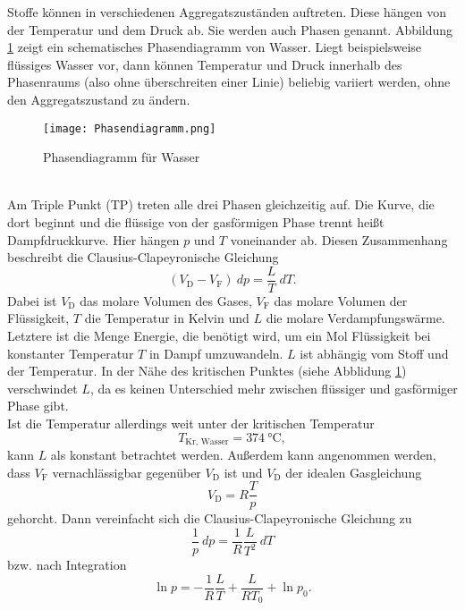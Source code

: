 Stoffe können in verschiedenen Aggregatszuständen auftreten. Diese hängen von der Temperatur und dem Druck ab. Sie werden auch Phasen genannt. Abbildung \ref{Phasendiagramm} zeigt ein schematisches Phasendiagramm von Wasser. Liegt beispielsweise flüssiges Wasser vor, dann können Temperatur und Druck innerhalb des Phasenraums (also ohne überschreiten einer Linie) beliebig variiert werden, ohne den Aggregatszustand zu ändern.
\begin{figure}[ht!]
	\centering
	\texttt{[image: Phasendiagramm.png]}
	\caption{Phasendiagramm für Wasser\cite{V203}}
	\label{Phasendiagramm}
\end{figure} \\
Am Triple Punkt (TP) treten alle drei Phasen gleichzeitig auf. Die Kurve, die dort beginnt und die flüssige von der gasförmigen Phase trennt heißt Dampfdruckkurve. Hier hängen $p$ und $T$ voneinander ab. Diesen Zusammenhang beschreibt die Clausius-Clapeyronische Gleichung
\begin{equation}\label{Clausius}
	(V_\text{D}-V_\text{F})\ dp = \frac{L}{T}\ dT.
\end{equation}
Dabei ist $V_\text{D}$ das molare Volumen des Gases, $V_\text{F}$ das molare Volumen der Flüssigkeit, $T$ die Temperatur in Kelvin und $L$ die molare Verdampfungswärme. \\
Letztere ist die Menge Energie, die benötigt wird, um ein Mol Flüssigkeit bei konstanter Temperatur $T$ in Dampf umzuwandeln. $L$ ist abhängig vom Stoff und der Temperatur. In der Nähe des kritischen Punktes (siehe Abblidung \ref{Phasendiagramm}) verschwindet $L$, da es keinen Unterschied mehr zwischen flüssiger und gasförmiger Phase gibt. \\
Ist die Temperatur allerdings weit unter der kritischen Temperatur \[T_\text{Kr, Wasser} = \SI{374}{\celsius},\] kann $L$ als konstant betrachtet werden. Außerdem kann angenommen werden, dass $V_\text{F}$ vernachlässigbar gegenüber $V_\text{D}$ ist und $V_\text{D}$ der idealen Gasgleichung
\begin{equation}\label{ideales Gas}
	V_\text{D} = R\frac{T}{p}
\end{equation}
gehorcht. Dann vereinfacht sich die Clausius-Clapeyronische Gleichung zu
\begin{equation}\label{Clausius einfach}
	\frac{1}{p}\ dp = \frac{1}{R}\frac{L}{T^2}\ dT
\end{equation}
bzw. nach Integration
\begin{equation}\label{Regression ln(p)=1/T}
	\ln p = - \frac{1}{R}\frac{L}{T} + \frac{L}{RT_0}+\ln p_0.
\end{equation}